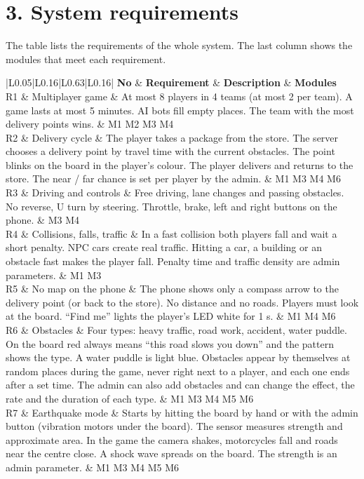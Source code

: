 \documentclass[
  english,
  10pt,
  a4paper,
]{article}
\newcommand{\ckkeep}[1]{\par\noindent\begin{minipage}{\linewidth}\setlength{\parskip}{4pt}#1\end{minipage}\par\smallskip}
\begin{document}
\section{3. System requirements}

\ckkeep{%
The table lists the requirements of the whole system. The last column shows the modules that meet
each requirement.

\begin{tabular}{|L{0.05}|L{0.16}|L{0.63}|L{0.16}|}
\hline \textbf{No} & \textbf{Requirement} & \textbf{Description} & \textbf{Modules} \\ \hline 
R1 & Multiplayer game & At most 8 players in 4 teams (at most 2 per team). A game lasts at most 5 minutes. AI bots fill empty places. The team with the most delivery points wins. & M1 M2 M3 M4 \\ \hline
R2 & Delivery cycle & The player takes a package from the store. The server chooses a delivery point by travel time with the current obstacles. The point blinks on the board in the player's colour. The player delivers and returns to the store. The near / far chance is set per player by the admin. & M1 M3 M4 M6 \\ \hline
R3 & Driving and controls & Free driving, lane changes and passing obstacles. No reverse, U turn by steering. Throttle, brake, left and right buttons on the phone. & M3 M4 \\ \hline
R4 & Collisions, falls, traffic & In a fast collision both players fall and wait a short penalty. NPC cars create real traffic. Hitting a car, a building or an obstacle fast makes the player fall. Penalty time and traffic density are admin parameters. & M1 M3 \\ \hline
R5 & No map on the phone & The phone shows only a compass arrow to the delivery point (or back to the store). No distance and no roads. Players must look at the board. ``Find me'' lights the player's LED white for 1 s. & M1 M4 M6 \\ \hline
R6 & Obstacles & Four types: heavy traffic, road work, accident, water puddle. On the board red always means ``this road slows you down'' and the pattern shows the type. A water puddle is light blue. Obstacles appear by themselves at random places during the game, never right next to a player, and each one ends after a set time. The admin can also add obstacles and can change the effect, the rate and the duration of each type. & M1 M3 M4 M5 M6 \\ \hline
R7 & Earthquake mode & Starts by hitting the board by hand or with the admin button (vibration motors under the board). The sensor measures strength and approximate area. In the game the camera shakes, motorcycles fall and roads near the centre close. A shock wave spreads on the board. The strength is an admin parameter. & M1 M3 M4 M5 M6 \\ \hline

\end{tabular}}
\end{document}
